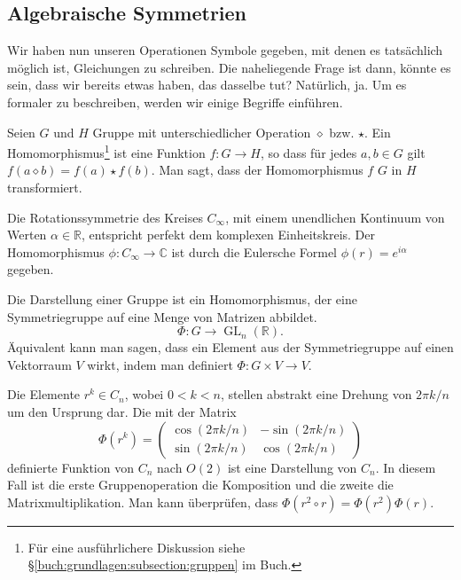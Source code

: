 \subsection{Algebraische Symmetrien}
Wir haben nun unseren Operationen Symbole gegeben, mit denen es tatsächlich
möglich ist, Gleichungen zu schreiben. Die naheliegende Frage ist dann, könnte
es sein, dass wir bereits etwas haben, das dasselbe tut?  Natürlich, ja.
Um es formaler zu beschreiben, werden wir einige Begriffe einführen.
\begin{definition}[Gruppenhomomorphismus]
	Seien \(G\) und \(H\) Gruppe mit unterschiedlicher Operation \(\diamond\)
	bzw.  \(\star\). Ein Homomorphismus\footnote{ Für eine ausführlichere
	Diskussion siehe \S\ref{buch:grundlagen:subsection:gruppen} im Buch.} ist
	eine Funktion \(f: G \to H\), so dass für jedes \(a, b \in G\) gilt
	\(f(a\diamond b) = f(a) \star f(b)\).  Man sagt, dass der Homomorphismus
	\(f\) \(G\) in \(H\) transformiert.
\end{definition}
\begin{beispiel}
	Die Rotationssymmetrie des Kreises \(C_\infty\), mit einem unendlichen
	Kontinuum von Werten \(\alpha \in \mathbb{R}\), entspricht perfekt dem
	komplexen Einheitskreis. Der Homomorphismus \(\phi: C_\infty \to \mathbb{C}\)
	ist durch die Eulersche Formel \(\phi(r) = e^{i\alpha}\) gegeben.
\end{beispiel}

\begin{definition}
	Die Darstellung einer Gruppe ist ein Homomorphismus, der eine Symmetriegruppe
	auf eine Menge von Matrizen abbildet.
	\[
		\Phi: G \to \operatorname{GL}_n(\mathbb{R}).
	\]
	Äquivalent kann man sagen, dass ein Element aus der Symmetriegruppe auf einen
	Vektorraum \(V\) wirkt, indem man definiert \(\Phi : G \times V \to V\).
\end{definition}
\begin{beispiel}
	Die Elemente \(r^k \in C_n\), wobei \(0 < k < n\), stellen abstrakt eine
	Drehung von \(2\pi k/n\) um den Ursprung dar. Die mit der Matrix 
	\[
		\Phi(r^k) = \begin{pmatrix}
			\cos(2\pi k/n) & -\sin(2\pi k/n) \\
			\sin(2\pi k/n) &  \cos(2\pi k/n)
		\end{pmatrix}
	\]
	definierte Funktion von \(C_n\) nach \(O(2)\) ist eine Darstellung von
	\(C_n\). In diesem Fall ist die erste Gruppenoperation die Komposition und
	die zweite die Matrixmultiplikation. Man kann überprüfen, dass \(\Phi(r^2
	\circ r) = \Phi(r^2)\Phi(r)\).
\end{beispiel}

